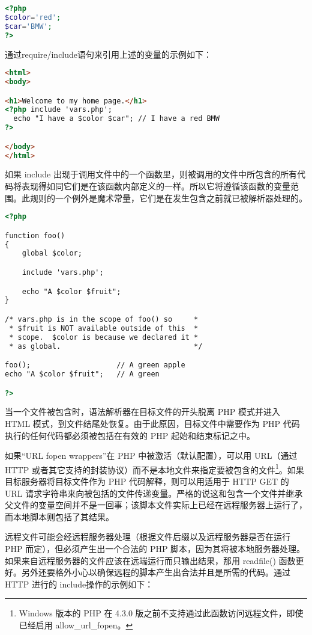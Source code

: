 \begin{lstlisting}[language=PHP]
<?php
$color='red';
$car='BMW';
?>
\end{lstlisting}


通过require/include语句来引用上述的变量的示例如下：


\begin{lstlisting}[language=HTML]
<html>
<body>

<h1>Welcome to my home page.</h1>
<?php include 'vars.php';
  echo "I have a $color $car"; // I have a red BMW
?>

</body>
</html>
\end{lstlisting}

如果 include 出现于调用文件中的一个函数里，则被调用的文件中所包含的所有代码将表现得如同它们是在该函数内部定义的一样。所以它将遵循该函数的变量范围。此规则的一个例外是魔术常量，它们是在发生包含之前就已被解析器处理的。

\begin{lstlisting}[language=HTML]
<?php

function foo()
{
    global $color;

    include 'vars.php';

    echo "A $color $fruit";
}

/* vars.php is in the scope of foo() so     *
 * $fruit is NOT available outside of this  *
 * scope.  $color is because we declared it *
 * as global.                               */

foo();                    // A green apple
echo "A $color $fruit";   // A green

?>
\end{lstlisting}

当一个文件被包含时，语法解析器在目标文件的开头脱离 PHP 模式并进入 HTML 模式，到文件结尾处恢复。由于此原因，目标文件中需要作为 PHP 代码执行的任何代码都必须被包括在有效的 PHP 起始和结束标记之中。

如果“URL fopen wrappers”在 PHP 中被激活（默认配置），可以用 URL（通过 HTTP 或者其它支持的封装协议）而不是本地文件来指定要被包含的文件\footnote{Windows 版本的 PHP 在 4.3.0 版之前不支持通过此函数访问远程文件，即使已经启用 allow\_url\_fopen。}。如果目标服务器将目标文件作为 PHP 代码解释，则可以用适用于 HTTP GET 的 URL 请求字符串来向被包括的文件传递变量。严格的说这和包含一个文件并继承父文件的变量空间并不是一回事；该脚本文件实际上已经在远程服务器上运行了，而本地脚本则包括了其结果。

远程文件可能会经远程服务器处理（根据文件后缀以及远程服务器是否在运行 PHP 而定），但必须产生出一个合法的 PHP 脚本，因为其将被本地服务器处理。如果来自远程服务器的文件应该在远端运行而只输出结果，那用 readfile() 函数更好。另外还要格外小心以确保远程的脚本产生出合法并且是所需的代码。通过 HTTP 进行的 include操作的示例如下：


